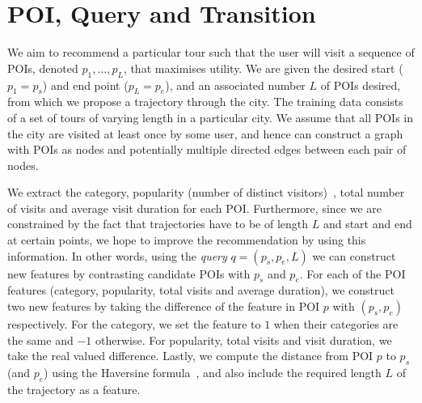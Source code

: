 \section{POI, Query and Transition}
\label{sec:feature}
\secmoveup


We aim to recommend a particular tour such that the user will visit a sequence of POIs, denoted $p_1, \ldots, p_L$, that maximises utility. We are given the desired start ($p_1=p_s$) and end point ($p_L=p_e$), and an associated number $L$ of POIs desired, from which we propose a trajectory through the city.
%
%
The training data consists of a set of tours of varying length in a particular city. We assume that all POIs %
in the city are visited at least once by some user, and hence can construct a graph with POIs as nodes and potentially multiple directed edges between each pair of nodes. 




We extract the category, popularity (number of distinct visitors)~\cite{ht10}, total number of visits and average visit duration for each POI.
Furthermore, since we are constrained by the fact that trajectories have to be of length $L$ and start and end at certain points, we hope to improve the recommendation by using this information.
In other words, using the \textit{query} $q = (p_s, p_e, L)$ we can construct new features by contrasting candidate POIs with $p_s$ and $p_e$.
%
For each of the POI features (category, popularity, total visits and average duration),
we construct two new features by taking the difference of the feature in POI $p$ with $(p_s, p_e)$ respectively.
For the category, we set the feature to $1$ when their categories are the same and $-1$ otherwise.
For popularity, total visits and visit duration, we take the real valued difference.
Lastly, we compute the distance from POI $p$ to $p_s$ (and $p_e$) using the Haversine formula~\cite{haversine},
and also include the required length $L$ of the trajectory as a feature.



